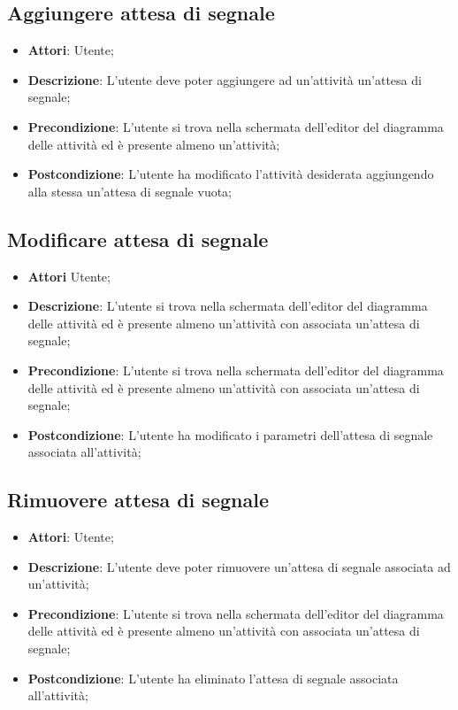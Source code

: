 \documentclass[../AnalisiDeiRequisiti.tex]{subfiles}
\begin{document}
	\subsection{Aggiungere attesa di segnale}
	\begin{itemize}
		\item \textbf{Attori}: Utente;
		\item \textbf{Descrizione}: L'utente deve poter aggiungere ad un'attività un'attesa di segnale;
		\item \textbf{Precondizione}: L'utente si trova nella schermata dell'editor del diagramma delle attività ed è presente almeno un'attività;
		\item \textbf{Postcondizione}: L'utente ha modificato l'attività desiderata aggiungendo alla stessa un'attesa di segnale vuota;
	\end{itemize}
	
	\subsection{Modificare attesa di segnale}
	\begin{itemize}
		\item \textbf{Attori} Utente;
		\item \textbf{Descrizione}: L'utente si trova nella schermata dell'editor del diagramma delle attività ed è presente almeno un'attività con associata un'attesa di segnale;
		\item \textbf{Precondizione}: L'utente si trova nella schermata dell'editor del diagramma delle attività ed è presente almeno un'attività con associata un'attesa di segnale;
		\item \textbf{Postcondizione}: L'utente ha modificato i parametri dell'attesa di segnale associata all'attività;
	\end{itemize}
	
	\subsection{Rimuovere attesa di segnale}
	\begin{itemize}
		\item \textbf{Attori}: Utente;
		\item \textbf{Descrizione}: L'utente deve poter rimuovere un'attesa di segnale associata ad un'attività;
		\item \textbf{Precondizione}: L'utente si trova nella schermata dell'editor del diagramma delle attività ed è presente almeno un'attività con associata un'attesa di segnale;
		\item \textbf{Postcondizione}: L'utente ha eliminato l'attesa di segnale associata all'attività;
	\end{itemize}
	
\end{document}
